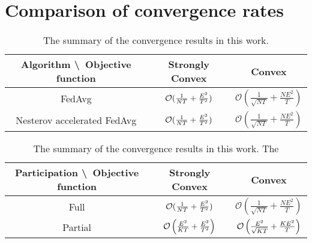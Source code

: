 

\section{Comparison of convergence rates}

\begin{table}
\centering
\begin{tabular}{|c|c|c|}\hline 
	Algorithm \textbackslash\  Objective function        & Strongly Convex        & Convex \\ \hline \hline
	FedAvg                         & ${\mathcal{O}}(\frac{1}{NT}+\frac{E^{2}}{T^{2}})$    &  $\mathcal{O}\left(\frac{1}{\sqrt{NT}}+\frac{NE^{2}}{T}\right)$       \\ \hline
	Nesterov accelerated FedAvg    & ${\mathcal{O}}(\frac{1}{NT}+\frac{E^{2}}{T^{2}})$    & $\mathcal{O}\left(\frac{1}{\sqrt{NT}}+\frac{NE^{2}}{T}\right)$       \\ \hline
\end{tabular}
\caption{The summary of the convergence results in this work.}
\end{table}

\begin{table}
\centering
\begin{tabular}{|c|c|c|}\hline 
	Participation \textbackslash\ Objective function            & Strongly Convex        & Convex \\ \hline \hline
	Full                         & ${\mathcal{O}}(\frac{1}{NT}+\frac{E^{2}}{T^{2}})$    &  $\mathcal{O}\left(\frac{1}{\sqrt{NT}}+\frac{NE^{2}}{T}\right)$       \\ \hline
	Partial                      &  ${\mathcal{O}}\left(\frac{E^{2}}{KT}+\frac{E^{2}}{T^{2}}\right)$   &  ${\mathcal{O}}\left(\frac{E^2}{\sqrt{KT}}+\frac{KE^2}{T} \right)$      \\ \hline
\end{tabular}
\caption{The summary of the convergence results in this work. The}
\end{table}



